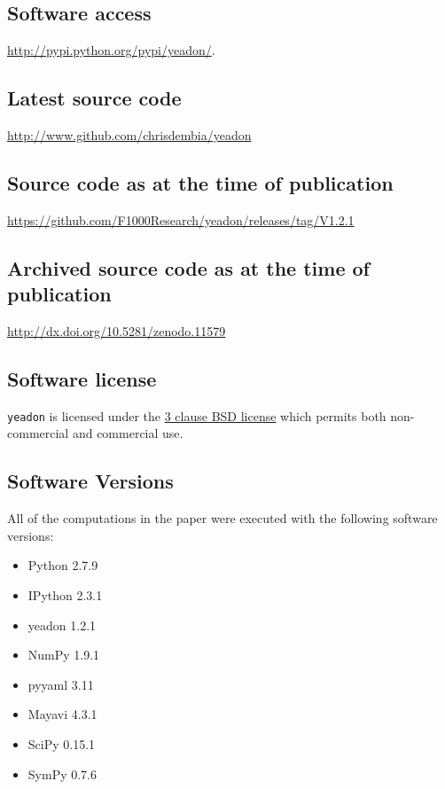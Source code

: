 \documentclass[10pt,a4paper,twocolumn]{article}
\begin{document}
\subsection*{Software access}
\url{http://pypi.python.org/pypi/yeadon/}.

\subsection*{Latest source code}
\url{http://www.github.com/chrisdembia/yeadon}

\subsection*{Source code as at the time of publication}
\url{https://github.com/F1000Research/yeadon/releases/tag/V1.2.1}

\subsection*{Archived source code as at the time of publication}
\url{http://dx.doi.org/10.5281/zenodo.11579} \cite{Christopher:11579}

\subsection*{Software license}
\verb+yeadon+ is licensed under the
\href{http://opensource.org/licenses/BSD-3-Clause}{3 clause BSD license} which
permits both non-commercial and commercial use.

\subsection*{Software Versions}
All of the computations in the paper were executed with the following software
versions:
\begin{itemize}
  \item Python 2.7.9
  \item IPython 2.3.1
  \item yeadon 1.2.1
  \item NumPy 1.9.1
  \item pyyaml 3.11
  \item Mayavi 4.3.1
  \item SciPy 0.15.1
  \item SymPy 0.7.6
\end{itemize}
\end{document}
